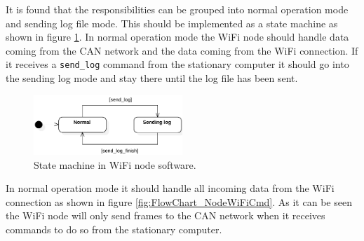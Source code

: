 It is found that the responsibilities can be grouped into normal operation mode and sending log file mode.
This should be implemented as a state machine as shown in figure \ref{fig:StateDiagram_NodeWiFiStates}.
In normal operation mode the WiFi node should handle data coming from the CAN network and the data coming from the WiFi connection.
If it receives a \texttt{send\_log} command from the stationary computer it should go into the sending log mode and stay there until the log file has been sent.\\

\begin{figure}[!h]
\centering
\includegraphics[width=0.5\textwidth]{graphics/StateDiagram_NodeWiFiStates}
\caption{State machine in WiFi node software.}
\label{fig:StateDiagram_NodeWiFiStates}
\end{figure}

In normal operation mode it should handle all incoming data from the WiFi connection as shown in figure \ref{fig:FlowChart_NodeWiFiCmd}.
As it can be seen the WiFi node will only send frames to the CAN network when it receives commands to do so from the stationary computer.\\

